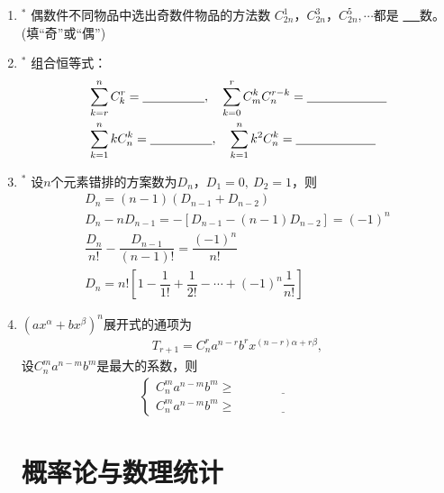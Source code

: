 \documentclass{article}
\newif\ifte
\newcommand{\q}{\quad}
\renewcommand\geq\geqslant
\begin{document}
\begin{multicols}{2}
\begin{enumerate}[leftmargin=20pt]
\item $^*$ 偶数件不同物品中选出奇数件物品的方法数
$ C_{2n}^1 $，$ C_{2n}^3 $，$ C_{2n}^5,\cdots $都是
\underline{\ \ifte 偶\else \hspace{0.5 cm} \fi\ }数。
(填“奇”或“偶”)

\item $^*$ 组合恒等式：
\begin{align*}
&\sum_{k=r}^{n} C_k^r=\underline{\ \ifte C_{n+1}^{r+1}
     \else \hspace{1.5cm} \fi\ },\q
\sum_{k=0}^{r}C_m^kC_n^{r-k}=\underline{\ \ifte 
    C_{n+m}^r \else \hspace{2cm} \fi\ }  \\
&\sum_{k=1}^{n} kC_n^k=\underline{\ \ifte n\cdot2^{n-1} 
     \else \hspace{1.5cm} \fi\ },\q 
\sum_{k=1}^{n} k^2C_n^k=\underline{\ \ifte 
    n(n+1)\cdot2^{n-2} \else \hspace{2cm} \fi\ } 
\end{align*}

\item $^*$ 设$ n $个元素错排的方案数为$ D_n $，$ D_1=0,\ D_2=1 $，则
\begin{gather*}
    D_n =(n-1)(D_{n-1}+D_{n-2}) \\
    D_n-nD_{n-1}=-[D_{n-1}-(n-1)D_{n-2}]=(-1)^n \\
    \dfrac{D_n}{n!}-\dfrac{D_{n-1}}{(n-1)!}=\dfrac{(-1)^n}{n!} \\
    D_n= n!\left[ 1-\dfrac{1}{1!}+\dfrac{1}{2!}-\cdots 
    +(-1)^n\dfrac{1}{n!}\right]
\end{gather*}

\item $ \left(ax^{\alpha}+bx^{\beta} \right)^n $展开式的通项为
\begin{gather*}
    T_{r+1}=C_n^ra^{n-r}b^rx^{(n-r)\alpha+r\beta} ,
\end{gather*}
设$ C_n^m a^{n-m}b^m $是最大的系数，则
\begin{align*}
\begin{cases}
    C_n^m a^{n-m}b^m\geq \underline{\ \ifte 
      C_n^{m-1} a^{n-m+1}b^{m-1} \else \hspace{3cm} \fi\ } \\
    C_n^m a^{n-m}b^m\geq \underline{\ \ifte 
      C_n^{m+1} a^{n-m-1}b^{m+1}\else \hspace{3cm} \fi\ }
\end{cases}
\end{align*} 

\section{概率论与数理统计}


\end{enumerate}
\end{multicols}
\end{document}
